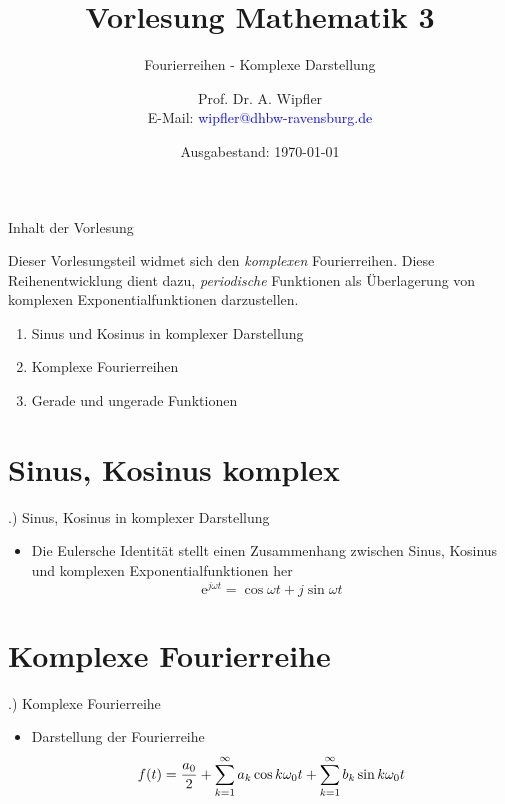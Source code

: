 \documentclass[t,14pt]{beamer}
\title[]{Vorlesung Mathematik 3}
\subtitle{Fourierreihen - Komplexe Darstellung}
\author[]{Prof. Dr. A. Wipfler\\ E-Mail: \textcolor{blue}{wipfler@dhbw-ravensburg.de}}
\institute[]{{\footnotesize Duale Hochschule Baden-W\"urttemberg, Ravensburg/Friedrichshafen}}
\date[]{Ausgabestand: \today}
\newcommand*\euler{\mathrm{e}} %
\begin{document}
\begin{frame}
\titlepage
\end{frame}





\begin{frame}{Inhalt der Vorlesung}


Dieser Vorlesungsteil widmet sich den \emph{komplexen} Fourierreihen. Diese Reihenentwicklung dient dazu, \emph{periodische} Funktionen als 
Überlagerung von komplexen Exponentialfunktionen darzustellen.
\begin{enumerate}
\item Sinus und Kosinus in komplexer Darstellung
\item Komplexe Fourierreihen
\item Gerade und ungerade Funktionen
\end{enumerate}

\end{frame}

\section{Sinus, Kosinus komplex}
\begin{frame}{\thesection .) Sinus, Kosinus in komplexer Darstellung}
\begin{itemize}
    \item Die Eulersche Identität stellt einen Zusammenhang zwischen Sinus, Kosinus und komplexen Exponentialfunktionen her 
    \[
    \euler^{j\omega t} = \cos \omega t+ j\sin\omega t
    \]
    \begin{center}
    \end{center}
\end{itemize}
\end{frame}

\section{Komplexe Fourierreihe}
\begin{frame}{\thesection .) Komplexe Fourierreihe}
    \begin{itemize}
        \item Darstellung der Fourierreihe
        \[
        f(t)=\frac{a_0}{2} + \sum\limits_{k=1}^{\infty} a_k\cos k\omega_0 t + \sum\limits_{k=1}^{\infty} b_k\sin k\omega_0 t 
        \]
        \begin{center}
        \end{center}
    \end{itemize}
\end{frame}
\end{document}
